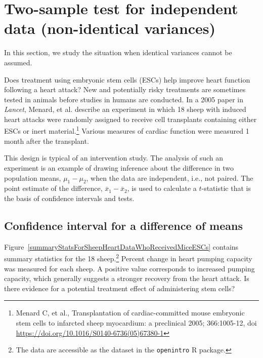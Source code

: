 \section[Two-sample test for independent data with non-identical variances]{Two-sample test for independent data (non-identical variances)}
\label{differenceOfTwoMeans}

In this section, we study the situation when identical variances cannot be assumed. 

Does treatment using embryonic stem cells (ESCs) help improve heart function following a heart attack? New and potentially risky treatments are sometimes tested in animals before studies in humans are conducted.  In a 2005 paper in \textit{Lancet}, Menard, et al. describe an experiment in which 18 sheep with induced heart attacks were randomly assigned to receive cell transplants containing either ESCs or inert material.\footnote{Menard C, et al., Transplantation of cardiac-committed mouse embryonic stem cells to infarcted sheep myocardium: a preclinical 2005; 366:1005-12, doi \url{https://doi.org/10.1016/S0140-6736(05)67380-1}}  Various measures of cardiac function were measured 1 month after the transplant.

This design is typical of an intervention study. The analysis of such an experiment is an example of drawing inference about the difference in two population means, $\mu_1 - \mu_2$, when the data are independent, i.e., not paired. The point estimate of the difference, $\overline{x}_1 - \overline{x}_2$, is used to calculate a $t$-statistic that is the basis of confidence intervals and tests.


\subsection{Confidence interval for a difference of means}
\label{confidenceIntervalDifferenceMeans}

Figure~\ref{summaryStatsForSheepHeartDataWhoReceivedMiceESCs} contains summary statistics for the 18 sheep.\footnote{The data are accessible as the dataset  in the \texttt{openintro} \textsf{R} package.}  Percent change in heart pumping capacity was measured for each sheep. A positive value corresponds to increased pumping capacity, which generally suggests a stronger recovery from the heart attack.  Is there evidence for a potential treatment effect of administering stem cells?


